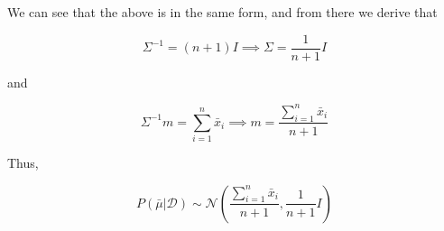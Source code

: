 \documentclass[11pt]{article}
\begin{document}
\begin{enumerate}
		\pagebreak
		
		We can see that the above is in the same form, and from there we derive that 
		
		\[\Sigma^{-1} = (n+1) I \implies \Sigma = \frac{1}{n+1} I\]
		
		and 
		
		\[\Sigma^{-1}m = \sum_{i=1}^n\bar{x}_i \implies m = \frac{\sum_{i=1}^n\bar{x}_i}{n+1}\]
		
		Thus, 
		
		\[\boxed{P(\bar{\mu} | \mathcal{D}) \sim \mathcal{N} \left (\frac{\sum_{i=1}^n\bar{x}_i}{n+1}, \frac{1}{n+1} I \right )}\]
		    
		\end{enumerate}
\end{document}
